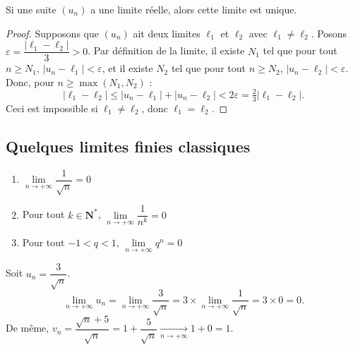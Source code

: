 \documentclass[11pt,a4paper,openany]{book}
\theoremstyle{definition}
\begin{document}
    \begin{Propriété}
    Si une suite $(u_n)$ a une limite réelle, alors cette limite est unique.
    \end{Propriété}
    \begin{proof}
    Supposons que $(u_n)$ ait deux limites $\ell_1$ et $\ell_2$ avec $\ell_1 \neq \ell_2$.
    Posons $\varepsilon = \dfrac{|\ell_1 - \ell_2|}{3} > 0$.
    Par définition de la limite, il existe $N_1$ tel que pour tout $n \geq N_1$,
    $|u_n - \ell_1| < \varepsilon$, et il existe $N_2$ tel que pour tout $n \geq N_2$,
    $|u_n - \ell_2| < \varepsilon$.
    Donc, pour $n \geq \max(N_1,N_2)$ :
    \[
        |\ell_1 - \ell_2| \leq |u_n - \ell_1| + |u_n - \ell_2| < 2\varepsilon
        = \tfrac{2}{3}|\ell_1 - \ell_2|.
    \]
    Ceci est impossible si $\ell_1 \neq \ell_2$, donc $\ell_1 = \ell_2$.
    \end{proof}

    \subsection{Quelques limites finies classiques}
    \begin{Propriété}
    \begin{enumerate}
        \item $\lim\limits_{n\to+\infty}\dfrac{1}{\sqrt{n}}=0$
        \item Pour tout $k\in\mathbf{N}^*$, $\lim\limits_{n\to+\infty}\dfrac{1}{n^k}=0$
        \item Pour tout $-1<q<1$, $\lim\limits_{n\to+\infty}q^n=0$
    \end{enumerate}
    \end{Propriété}

    \begin{Exemple}
    Soit $u_n=\dfrac{3}{\sqrt{n}}$.
    \[
        \lim_{n\to+\infty}u_n
        = \lim_{n\to+\infty}\frac{3}{\sqrt{n}}
        = 3\times\lim_{n\to+\infty}\frac{1}{\sqrt{n}}
        = 3\times 0 = 0.
    \]
    De même, $v_n=\dfrac{\sqrt{n}+5}{\sqrt{n}}=1+\dfrac{5}{\sqrt{n}}\xrightarrow[n\to+\infty]{}1+0=1$.
    \end{Exemple}
\end{document}
